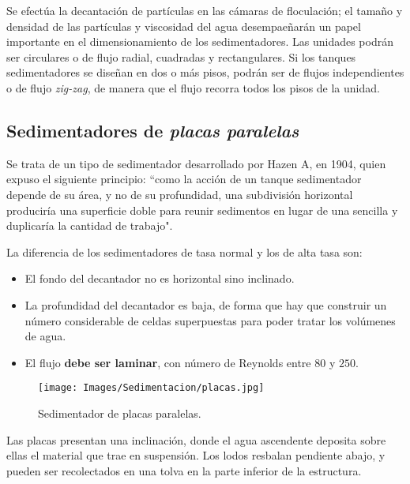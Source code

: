 \noindent
\justify

Se efect\'ua la decantaci\'on de part\'iculas en las c\'amaras de floculaci\'on; el tama\~no y densidad de las part\'iculas y viscosidad del agua desempae\~nar\'an un papel importante en el dimensionamiento de los sedimentadores. Las unidades podr\'an ser circulares o de flujo radial, cuadradas y rectangulares. Si los tanques sedimentadores se dise\~nan en dos o m\'as pisos, podr\'an ser de flujos independientes o de flujo \textit{zig-zag}, de manera que el flujo recorra todos los pisos de la unidad.

\subsection{Sedimentadores de \textit{placas paralelas}}

\noindent
\justify

Se trata de un tipo de sedimentador desarrollado por Hazen A, en 1904, quien expuso el siguiente principio: ``como la acci\'on de un tanque sedimentador depende de su \'area, y no de su profundidad, una subdivisi\'on horizontal producir\'ia una superficie doble para reunir sedimentos en lugar de una sencilla y duplicar\'ia la cantidad de trabajo". 

\noindent
\justify

La diferencia de los sedimentadores de tasa normal y los de alta tasa son:

\begin{itemize}
	\item El fondo del decantador no es horizontal sino inclinado.
	\item La profundidad del decantador es baja, de forma que hay que construir un n\'umero considerable de celdas superpuestas para poder tratar los vol\'umenes de agua.
	\item El flujo \textbf{debe ser laminar}, con n\'umero de Reynolds entre $80$ y $250$.
\end{itemize}

\begin{figure}[h!]
	\centering
	\texttt{[image: Images/Sedimentacion/placas.jpg]}
	\caption{Sedimentador de placas paralelas.}
	\label{placas}
\end{figure}

\noindent
\justify

Las placas presentan una inclinaci\'on, donde el agua ascendente deposita sobre ellas el material que trae en suspensi\'on. Los lodos resbalan pendiente abajo, y pueden ser recolectados en una tolva en la parte inferior de la estructura.

